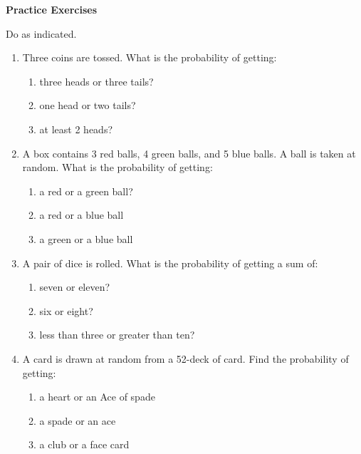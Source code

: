 \textbf{Practice Exercises}

\vspce

Do as indicated. 
\begin{enumerate}[label = \arabic*. ]
\item Three coins are tossed. What is the probability of getting: 
\begin{enumerate}[label = \alph*. ]
\item three heads or three tails? 
\item one head or two tails?
\item at least 2 heads? 
\end{enumerate} 

\item A box contains 3 red balls, 4 green balls,  and 5 blue balls. A ball is taken at random. What is the probability 
of getting:
\begin{enumerate}[label = \alph*. ]
\item a red or a green ball? 
\item a red or a blue ball
\item a green or a blue ball
\end{enumerate} 

\item A pair of dice is rolled. What is the probability of getting a sum of: 
\begin{enumerate}[label = \alph*. ]
\item seven or eleven? 
\item six or eight? 
\item less than three or greater than ten? 
\end{enumerate} 

\item A card is drawn at random from a 52-deck of card. Find the probability of getting: 
\begin{enumerate}[label = \alph*. ]
\item a heart or an Ace of spade
\item a spade or an ace
\item a club or a face card
\end{enumerate} 

\end{enumerate}  

